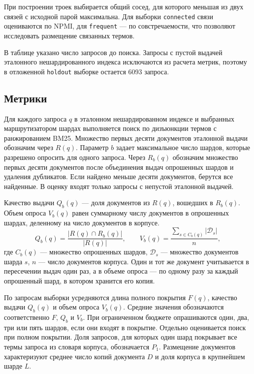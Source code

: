 \documentclass[10pt, a4paper, twoside]{article}
\newcommand{\strategy}[1]{\texttt{#1}}
\begin{document}
\begin{ntvbody}

При построении троек выбирается общий сосед, для которого меньшая из двух связей с исходной парой максимальна.
Для выборки \strategy{connected} связи оцениваются по NPMI, для \strategy{frequent} --- по совстречаемости, что позволяют исследовать размещение связанных термов.

В таблице указано число запросов до поиска.
Запросы с пустой выдачей эталонного нешардированного индекса исключаются из расчета метрик, поэтому в отложенной \strategy{holdout} выборке остается 6093 запроса.

\subsection{Метрики}
Для каждого запроса $q$ в эталонном нешардированном индексе и выбранных маршрутизатором шардах выполняется поиск по дизъюнкции термов с ранжированием BM25.
Множество первых десяти документов эталонной выдачи обозначим через $R(q)$.
Параметр $b$ задает максимальное число шардов, которые разрешено опросить для одного запроса.
Через $R_b(q)$ обозначим множество первых десяти документов после объединения выдач опрошенных шардов и удаления дубликатов.
Если найдено меньше десяти документов, берутся все найденные.
В оценку входят только запросы с непустой эталонной выдачей.

Качество выдачи $Q_b(q)$ --- доля документов из $R(q)$, вошедших в $R_b(q)$.
Объем опроса $V_b(q)$ равен суммарному числу документов в опрошенных шардах, деленному на число документов в корпусе.
\begin{equation}
 Q_b(q)=\frac{|R(q)\cap R_b(q)|}{|R(q)|},
 \qquad
 V_b(q)=\frac{\sum_{s\in C_b(q)}|\mathcal D_s|}{n},
 \label{eq:metrics}
\end{equation}
где $C_b(q)$ --- множество опрошенных шардов, $\mathcal D_s$ --- множество документов шарда $s$, $n$ --- число документов корпуса.
Один и тот же документ учитывается в пересечении выдач один раз, а в объеме опроса --- по одному разу за каждый опрошенный шард, в котором хранится его копия.

По запросам выборки усредняются длина полного покрытия $F(q)$, качество выдачи $Q_b(q)$ и объем опроса $V_b(q)$.
Средние значения обозначаются соответственно $F$, $Q_b$ и $V_b$.
При ограниченном бюджете опрашиваются один, два, три или пять шардов, если они входят в покрытие.
Отдельно оценивается поиск при полном покрытии.
Доля запросов, для которых один шард покрывает все термы запроса из словаря корпуса, обозначается $P_1$.
Размещение документов характеризуют среднее число копий документа $D$ и доля корпуса в крупнейшем шарде $L$.


\end{ntvbody}
\end{document}
